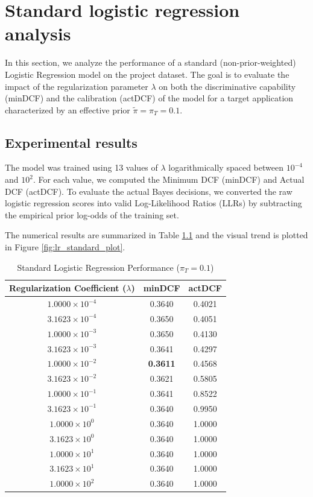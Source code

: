 \chapter{Standard logistic regression analysis}

In this section, we analyze the performance of a standard (non-prior-weighted) Logistic Regression model on the project dataset. The goal is to evaluate the impact of the regularization parameter $\lambda$ on both the discriminative capability (minDCF) and the calibration (actDCF) of the model for a target application characterized by an effective prior $\tilde{\pi} = \pi_T = 0.1$.

\section{Experimental results}

The model was trained using 13 values of $\lambda$ logarithmically spaced between $10^{-4}$ and $10^{2}$. For each value, we computed the Minimum DCF (minDCF) and Actual DCF (actDCF). To evaluate the actual Bayes decisions, we converted the raw logistic regression scores into valid Log-Likelihood Ratios (LLRs) by subtracting the empirical prior log-odds of the training set.

The numerical results are summarized in Table \ref{tab:std_lr_results} and the visual trend is plotted in Figure \ref{fig:lr_standard_plot}.

\begin{table}[h]
    \centering
    \caption{Standard Logistic Regression Performance ($\pi_T = 0.1$)}
    \label{tab:std_lr_results}
    \begin{tabular}{@{}ccc@{}}
        \toprule
        \textbf{Regularization Coefficient ($\lambda$)} & \textbf{minDCF} & \textbf{actDCF} \\ \midrule
        $1.0000 \times 10^{-4}$ & 0.3640 & 0.4021 \\
        $3.1623 \times 10^{-4}$ & 0.3650 & 0.4051 \\
        $1.0000 \times 10^{-3}$ & 0.3650 & 0.4130 \\
        $3.1623 \times 10^{-3}$ & 0.3641 & 0.4297 \\
        $1.0000 \times 10^{-2}$ & \textbf{0.3611} & 0.4568 \\
        $3.1623 \times 10^{-2}$ & 0.3621 & 0.5805 \\
        $1.0000 \times 10^{-1}$ & 0.3641 & 0.8522 \\
        $3.1623 \times 10^{-1}$ & 0.3640 & 0.9950 \\
        $1.0000 \times 10^{0}$  & 0.3640 & 1.0000 \\
        $3.1623 \times 10^{0}$  & 0.3640 & 1.0000 \\
        $1.0000 \times 10^{1}$  & 0.3640 & 1.0000 \\
        $3.1623 \times 10^{1}$  & 0.3640 & 1.0000 \\
        $1.0000 \times 10^{2}$  & 0.3640 & 1.0000 \\
        \bottomrule
    \end{tabular}
\end{table}

